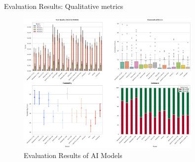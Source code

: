\documentclass{beamer}
\begin{document}
\begin{frame}{Evaluation Results: Qualitative metrics}
  \begin{figure}
    \centering
    \includegraphics[width=0.8\textwidth]{combined_metrics.png}
    \caption{Evaluation Results of AI Models}
    \label{fig:evaluation-results}
  \end{figure}
\end{frame}
\end{document}
